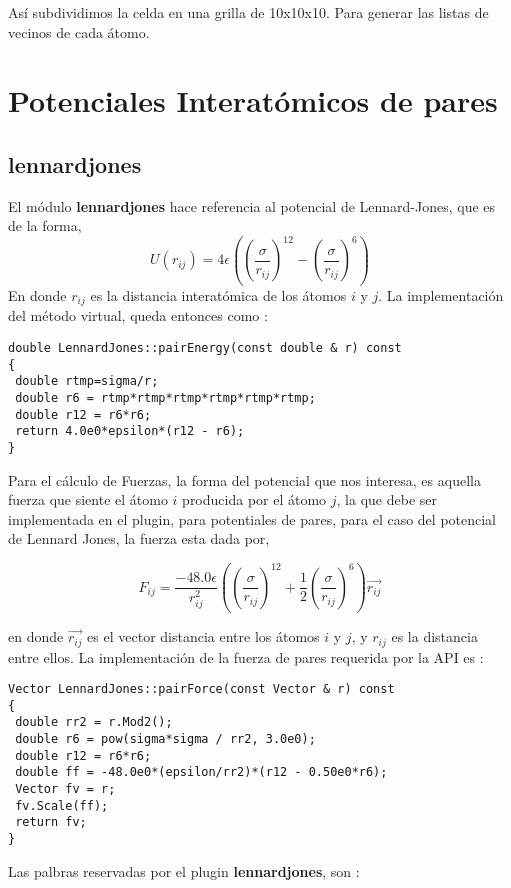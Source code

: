 As\'i subdividimos la celda en una grilla de 10x10x10. Para generar las listas de vecinos de cada \'atomo.
\section{Potenciales Interat\'omicos de pares}
\subsection{lennardjones}
El m\'odulo \textbf{lennardjones} hace referencia al potencial de Lennard-Jones, que es de la forma,
$$U(r_{ij}) = 4\epsilon\left(\left(\frac{\sigma}{r_{ij}}\right)^{12}-\left(\frac{\sigma}{r_{ij}}\right)^6\right)$$
En donde $r_{ij}$ es la distancia interat\'omica de los \'atomos $i$ y $j$. La implementaci\'on del m\'etodo virtual, queda entonces como :
\begin{verbatim}
double LennardJones::pairEnergy(const double & r) const
{
 double rtmp=sigma/r;
 double r6 = rtmp*rtmp*rtmp*rtmp*rtmp*rtmp;
 double r12 = r6*r6;
 return 4.0e0*epsilon*(r12 - r6);
}
\end{verbatim}

Para el c\'alculo de Fuerzas, la forma del potencial que nos interesa, es aquella fuerza que siente el \'atomo $i$ producida por el \'atomo $j$, la que debe ser implementada en el plugin, para potentiales de pares, para el caso del potencial de Lennard Jones, la fuerza esta dada por,

$$F_{ij} = \frac{-48.0\epsilon}{r_{ij}^2}\left( \left(\frac{\sigma}{r_{ij}}\right)^{12} + \frac{1}{2}\left(\frac{\sigma}{r_{ij}}\right)^6 \right) \vec{r_{ij}}$$

en donde $\vec{r_{ij}}$ es el vector distancia entre los \'atomos $i$ y $j$, y $r_{ij}$ es la distancia entre ellos. La implementaci\'on de la fuerza de pares requerida por la API es :

\begin{verbatim}
Vector LennardJones::pairForce(const Vector & r) const
{
 double rr2 = r.Mod2();
 double r6 = pow(sigma*sigma / rr2, 3.0e0);
 double r12 = r6*r6;
 double ff = -48.0e0*(epsilon/rr2)*(r12 - 0.50e0*r6);
 Vector fv = r;
 fv.Scale(ff);
 return fv;
}
\end{verbatim}

Las palbras reservadas por el plugin \textbf{lennardjones}, son :


